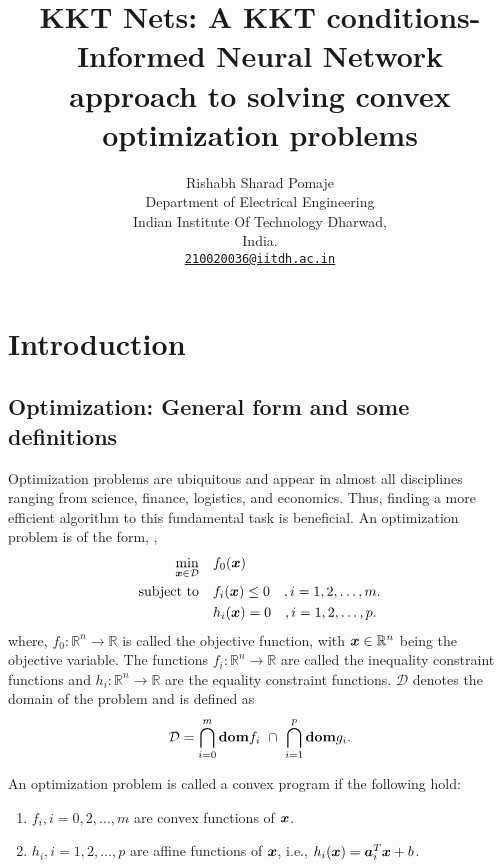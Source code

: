 \documentclass{article} %
\title{KKT Nets: A KKT conditions-Informed Neural Network approach to solving convex optimization problems}
\author{Rishabh Sharad Pomaje \\
Department of Electrical Engineering\\
Indian Institute Of Technology Dharwad,\\
India.\\
\texttt{\href{mailto:210020036@iitdh.ac.in}{210020036@iitdh.ac.in}}}
\begin{document}
\maketitle

\begin{abstract}
   \lipsum[15]
\end{abstract}

\section{Introduction}

\subsection{Optimization: General form and some definitions}
Optimization problems are ubiquitous and appear in almost all disciplines ranging from science, finance, logistics, and economics. Thus, finding a more efficient algorithm to this fundamental task is beneficial. An optimization problem is of the form, \cite{Boyd_Vandenberghe_2004}, 
\begin{subequations}\label{eq:genOptProb}
    \begin{align}
        \min_{{\bm{x}} \in \mathcal{D}}\quad &f_0({\bm{x}}) \\
        \text{subject to}\quad &f_i({\bm{x}}) \leq 0 \quad ,i = 1, 2, \dots, m. \\
        \quad &h_i({\bm{x}}) = 0 \quad ,i = 1, 2, \dots, p.  
    \end{align}
\end{subequations}
where, $f_0:\mathbb{R}^n\rightarrow\mathbb{R}$ is called the objective function, with ${\bm{x}} \in \mathbb{R}^n$ being the objective variable. The functions $f_i:\mathbb{R}^n \rightarrow \mathbb{R}$ are called the inequality constraint functions and $h_i:\mathbb{R}^n \rightarrow \mathbb{R}$ are the equality constraint functions. $\mathcal{D}$ denotes the domain of the problem and is defined as 
\begin{align}
   \mathcal{D} = \bigcap_{i=0}^{m} \text{\textbf{dom}}f_i\ \cap\ \bigcap_{i=1}^{p} \text{\textbf{dom}}g_i. \label{eq:ProbDomain}
\end{align}

An optimization problem is called a convex program if the following hold:
\begin{enumerate}
    \item $f_i, i = 0, 2, \dots, m$ are convex functions of ${\bm{x}}$.
    \item $h_i, i = 1, 2, \dots, p$ are affine functions of ${\bm{x}}$, i.e., $h_i({\bm{x}}) = {\bm{a}}_i^T {\bm{x}} + b$.
\end{enumerate}
\end{document}
